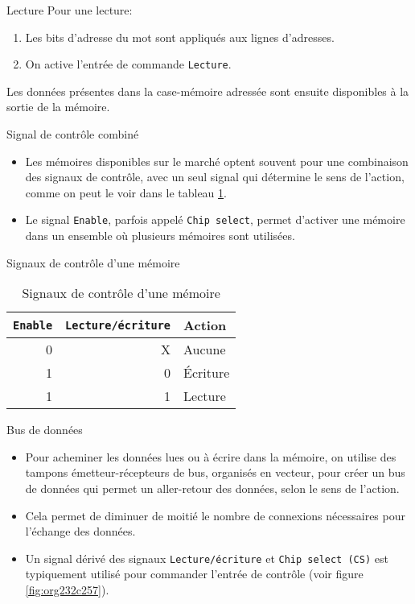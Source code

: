 \documentclass[presentation]{beamer}
\begin{document}
\begin{frame}[label={sec:org849783e},fragile]{Lecture}
 Pour une lecture:

\begin{enumerate}
\item Les bits d'adresse du mot sont appliqués aux lignes d'adresses.
\item On active l'entrée de commande \texttt{Lecture}.
\end{enumerate}

Les données présentes dans la case-mémoire adressée sont ensuite
disponibles à la sortie de la mémoire.
\end{frame}

\begin{frame}[label={sec:orgce8c927},fragile]{Signal de contrôle combiné}
 \begin{itemize}
\item Les mémoires disponibles sur le marché optent souvent pour une combinaison des signaux de contrôle, avec un seul signal qui détermine le sens de l'action, comme on peut le voir dans le tableau \ref{tab:org4372254}.

\item Le signal \texttt{Enable}, parfois appelé \texttt{Chip select}, permet d'activer une mémoire dans un ensemble où plusieurs mémoires sont utilisées.
\end{itemize}
\end{frame}

\begin{frame}[label={sec:org6176e00},fragile]{Signaux de contrôle d'une mémoire}
 \begin{table}[htbp]
\caption{\label{tab:org4372254}Signaux de contrôle d'une mémoire}
\centering
\begin{tabular}{rrl}
\texttt{Enable} & \texttt{Lecture/écriture} & Action\\
\hline
0 & X & Aucune\\
1 & 0 & Écriture\\
1 & 1 & Lecture\\
\end{tabular}
\end{table}
\end{frame}

\begin{frame}[label={sec:org67d5ff1},fragile]{Bus de données}
 \begin{itemize}
\item Pour acheminer les données lues ou à écrire dans la mémoire, on utilise des tampons émetteur-récepteurs de bus, organisés en vecteur, pour créer un \alert{bus de données} qui permet un aller-retour des données, selon le sens de l'action.

\item Cela permet de diminuer de moitié le nombre de connexions nécessaires pour l'échange des données.

\item Un signal dérivé des signaux \texttt{Lecture/écriture} et \texttt{Chip select (CS)} est typiquement utilisé pour commander l'entrée de contrôle (voir figure \ref{fig:org232c257}).
\end{itemize}
\end{frame}
\end{document}
